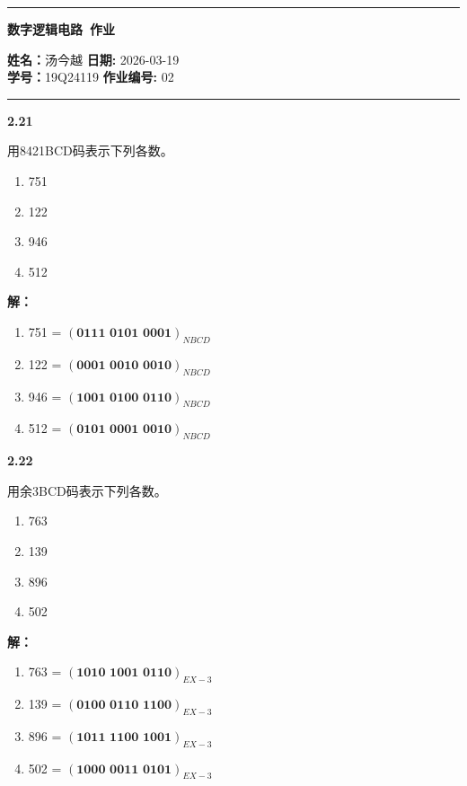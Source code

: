 \documentclass[10pt, a4paper]{article}
\newcommand{\question}[2]{
    \vspace{2ex}\noindent\textbf{#1}\ {\kaishu #2} \par\vspace{1ex}
}
\newcommand{\solution}[1]{
    \noindent\textbf{解：}{\songti #1} \par\vspace{3ex}
}
\begin{document}
\thispagestyle{plain}
\begin{center}
	\hrule
	\vspace{.4cm}
	{\textbf { \large 数字逻辑电路\ 作业}}
\end{center}
{ \textbf{姓名：}}汤今越 \hspace{\fill} \textbf{日期:} 2026-03-19 \\
{ \textbf{学号：}}19Q24119 \hspace{\fill} \textbf{作业编号:} 02 \\
	\hrule
\vspace{3ex}


\question{2.21}{
用8421BCD码表示下列各数。
\begin{enumerate}
	\item 751
	\item 122
	\item 946
	\item 512
\end{enumerate}
}

\solution{
\begin{enumerate}
	\item 751 = $ (\textbf{0111 0101 0001})_{NBCD} $
	\item 122 = $ (\textbf{0001 0010 0010})_{NBCD} $
	\item 946 = $ (\textbf{1001 0100 0110})_{NBCD} $
	\item 512 = $ (\textbf{0101 0001 0010})_{NBCD} $
\end{enumerate}
}

\question{2.22}{
用余3BCD码表示下列各数。
\begin{enumerate}
	\item 763
	\item 139
	\item 896
	\item 502
\end{enumerate}
}

\solution{
\begin{enumerate}
	\item 763 = $ (\textbf{1010 1001 0110})_{EX-3} $
	\item 139 = $ (\textbf{0100 0110 1100})_{EX-3} $
	\item 896 = $ (\textbf{1011 1100 1001})_{EX-3} $
	\item 502 = $ (\textbf{1000 0011 0101})_{EX-3} $
\end{enumerate}
}
\end{document}
